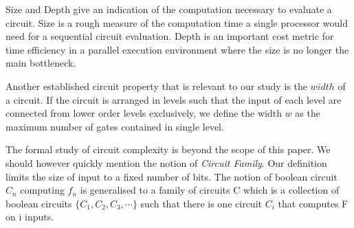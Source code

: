 \par
Size and Depth give an indication of the computation necessary to evaluate a circuit.
Size is a rough measure of the computation time a single processor would need for
a sequential circuit evaluation. Depth is an important cost metric for time
efficiency in a parallel execution environment where the size is no longer the
main bottleneck\cite{notes}.
\par
Another  established circuit property that is relevant to our study is the $width$
of a circuit\cite{clark}. If the circuit is arranged in levels such that the input
of each level are connected from lower order levels exclusively, we define the
width $w$ as the maximum number of gates contained in single level.
\par
The formal study of circuit complexity is beyond the scope of this paper. We should
however quickly mention the notion of \textit{Circuit Family}. Our definition
limits the size of input to a fixed number of bits. The notion of boolean circuit
$C_n$ computing $f_n$  is generalised to a family of circuits C which is a
collection of boolean circuits $\{C_1, C_2, C_3, \cdots\}$ such that there is one
circuit $C_i$ that computes F on i inputs.
%
%
